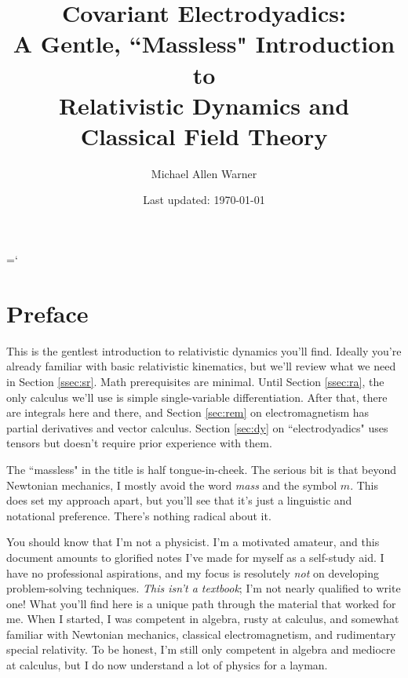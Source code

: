 \documentclass[12pt]{article}
\begin{document}
\title{Covariant Electrodyadics:\\A Gentle, \texorpdfstring{``}{“}Massless\texorpdfstring{"}{”} Introduction to\\Relativistic Dynamics and\\Classical Field Theory}
\author{Michael Allen Warner}
\date{Last updated: \today}

\begin{titlingpage}
\maketitle
\end{titlingpage}

\clearpage

\setcounter{page}{2}
\hyphenchar{} %
\tableofcontents
\hyphenchar\font=`\- %

\clearpage

\section*{Preface}\label{sec:p}

This is the gentlest introduction to relativistic dynamics you'll find. Ideally you're already familiar with basic relativistic kinematics, but we'll review what we need in Section \ref{ssec:sr}. Math prerequisites are minimal. Until Section \ref{ssec:ra}, the only calculus we'll use is simple single-variable differentiation. After that, there are integrals here and there, and Section \ref{sec:rem} on electromagnetism has partial derivatives and vector calculus. Section \ref{sec:dy} on ``electrodyadics" uses tensors but doesn't require prior experience with them.

The ``massless" in the title is half tongue-in-cheek. The serious bit is that beyond Newtonian mechanics, I mostly avoid the word \emph{mass} and the symbol $m$. This does set my approach apart, but you'll see that it's just a linguistic and notational preference. There's nothing radical about it.

You should know that I'm not a physicist. I'm a motivated amateur, and this document amounts to glorified notes I've made for myself as a self-study aid. I have no professional aspirations, and my focus is resolutely \emph{not} on developing problem-solving techniques. \emph{This isn't a textbook}; I'm not nearly qualified to write one! What you'll find here is a unique path through the material that worked for me. When I started, I was competent in algebra, rusty at calculus, and somewhat familiar with Newtonian mechanics, classical electromagnetism, and rudimentary special relativity. To be honest, I'm still only competent in algebra and mediocre at calculus, but I do now understand a lot of physics for a layman.
\end{document}
